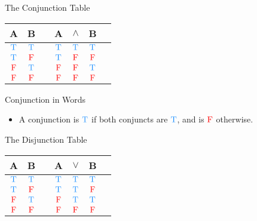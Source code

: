\documentclass[
  ignorenonframetext,
]{beamer}
\providecommand{\tightlist}{%
  \setlength{\itemsep}{0pt}\setlength{\parskip}{0pt}}
\renewcommand{\,}{\text{, }}
\def\True{\textcolor{dodgerblue}{\text{T}}}
\def\False{\textcolor{red}{\text{F}}}
\begin{document}
\begin{frame}{The Conjunction Table}
\protect\hypertarget{the-conjunction-table}{}

\begin{center}
\begin{tabular}{@{ }c@{ }@{ }c | c@{ }@{ }c@{ }@{ }c@{ }@{ }c@{ }@{ }c}
A & B &  & A & $\wedge$ & B & \\
\hline 
$\True$ & $\True$ &  & $\True$ & \textcolor{red}{$\True$} & $\True$ & \\
$\True$ & $\False$ &  & $\True$ & \textcolor{red}{$\False$} & $\False$ & \\
$\False$ & $\True$ &  & $\False$ & \textcolor{red}{$\False$} & $\True$ & \\
$\False$ & $\False$ &  & $\False$ & \textcolor{red}{$\False$} & $\False$ & \\
\end{tabular}
\end{center}

\end{frame}

\begin{frame}{Conjunction in Words}
\protect\hypertarget{conjunction-in-words}{}

\begin{itemize}
\tightlist
\item
  A conjunction is \(\True\) if both conjuncts are \(\True\), and is
  \(\False\) otherwise.
\end{itemize}

\end{frame}

\begin{frame}{The Disjunction Table}
\protect\hypertarget{the-disjunction-table}{}

\begin{center}
\begin{tabular}{@{ }c@{ }@{ }c | c@{ }@{ }c@{ }@{ }c@{ }@{ }c@{ }@{ }c}
A & B &  & A & $\vee$ & B & \\
\hline 
$\True$ & $\True$ &  & $\True$ & \textcolor{red}{$\True$} & $\True$ & \\
$\True$ & $\False$ &  & $\True$ & \textcolor{red}{$\True$} & $\False$ & \\
$\False$ & $\True$ &  & $\False$ & \textcolor{red}{$\True$} & $\True$ & \\
$\False$ & $\False$ &  & $\False$ & \textcolor{red}{$\False$} & $\False$ & \\
\end{tabular}
\end{center}

\end{frame}
\end{document}
